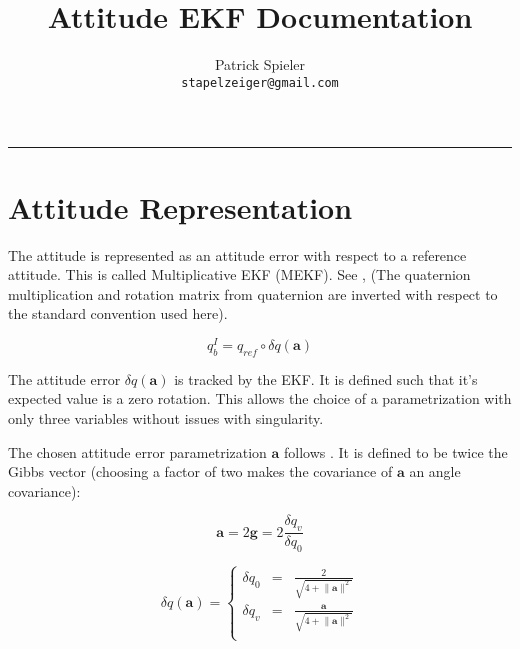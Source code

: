 \documentclass[a4paper]{paper}
\author{
Patrick Spieler \\
\texttt{stapelzeiger@gmail.com}
}
\title{Attitude EKF Documentation}
\begin{document}
\maketitle
\hrule
\bigskip







\section{Attitude Representation}

The attitude is represented as an attitude error with respect to a reference attitude. This is called Multiplicative EKF (MEKF). See \cite{MarkleyAttitudeErrorRepr}, (The quaternion multiplication and rotation matrix from quaternion are inverted with respect to the standard convention used here).


\begin{equation}
    q_b^I = q_{ref} \circ \delta q(\bm{a})
    \label{eq:delta_q}
\end{equation}


The attitude error $\delta q(\bm{a})$ is tracked by the EKF. It is defined such that it's expected value is a zero rotation. This allows the choice of a parametrization with only three variables without issues with singularity.

The chosen attitude error parametrization $\bm{a}$ follows \cite{MarkleyAttitudeErrorRepr}. It is defined to be twice the Gibbs vector (choosing a factor of two makes the covariance of $\bm{a}$ an angle covariance):

\begin{equation}
    \bm{a} = 2\bm{g} = 2 \frac{\delta q_v}{\delta q_0}
\end{equation}

\begin{equation}
    \delta q(\bm{a}) =
    \left\{
      \begin{array}{rcl}
        \delta q_{0} & = & \frac{2}{\sqrt{4+\lVert\bm{a}\rVert^2}} \\
        \delta q_{v} & = & \frac{\bm{a}}{\sqrt{4+\lVert\bm{a}\rVert^2}} \\
      \end{array}
    \right.
\label{eq:delta_q_from_a}
\end{equation}
\end{document}
